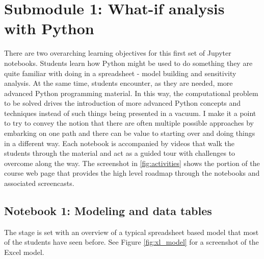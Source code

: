 \documentclass[ited,blindrev]{informs3}              %
\begin{document}
\section{Submodule 1: What-if analysis with Python}

There are two overarching learning objectives for this first set of Jupyter notebooks. Students learn how Python might be used to do something they are quite familiar with doing in a spreadsheet - model building and sensitivity analysis. At the same time, students encounter, as they are needed, more advanced Python programming material. In this way, the computational problem to be solved drives the introduction of more advanced Python concepts and techniques instead of such things being presented in a vacuum. I make it a point to try to convey the notion that there are often multiple possible approaches by embarking on one path and there can be value to starting over and doing things in a different way. Each notebook is accompanied by videos that walk the students through the material and act as a guided tour with challenges to overcome along the way. The screenshot in \ref{fig:activities} shows the portion of the course web page that provides the high level roadmap through the notebooks and associated screencasts.
 
 
\subsection{Notebook 1: Modeling and data tables}

The stage is set with an overview of a typical spreadsheet based model that most of the students have seen before. See Figure \ref{fig:xl_model} for a screenshot of the Excel model.
\end{document}
